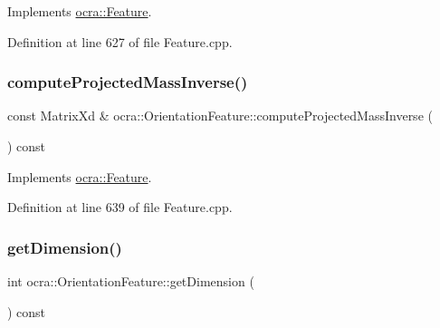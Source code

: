 Implements \hyperlink{classocra_1_1Feature_ac529096b3fe8eba1ab88a56d8b042d37}{ocra\+::\+Feature}.



Definition at line 627 of file Feature.\+cpp.

\hypertarget{classocra_1_1OrientationFeature_a56caa1399bd0f474a91da570c8be57bb}{}\label{classocra_1_1OrientationFeature_a56caa1399bd0f474a91da570c8be57bb} 
\subsubsection{\texorpdfstring{compute\+Projected\+Mass\+Inverse()}{computeProjectedMassInverse()}\hspace{0.1cm}{\footnotesize\ttfamily [2/2]}}
{\footnotesize\ttfamily const Matrix\+Xd \& ocra\+::\+Orientation\+Feature\+::compute\+Projected\+Mass\+Inverse (\begin{DoxyParamCaption}{ }\end{DoxyParamCaption}) const\hspace{0.3cm}{\ttfamily [virtual]}}



Implements \hyperlink{classocra_1_1Feature_ac27bcbdbb8541e3b4e2c77a6d6f2ffc0}{ocra\+::\+Feature}.



Definition at line 639 of file Feature.\+cpp.

\hypertarget{classocra_1_1OrientationFeature_a20e61cf1de83429db026d162fc5d459e}{}\label{classocra_1_1OrientationFeature_a20e61cf1de83429db026d162fc5d459e} 
\subsubsection{\texorpdfstring{get\+Dimension()}{getDimension()}}
{\footnotesize\ttfamily int ocra\+::\+Orientation\+Feature\+::get\+Dimension (\begin{DoxyParamCaption}{ }\end{DoxyParamCaption}) const\hspace{0.3cm}{\ttfamily [virtual]}}



